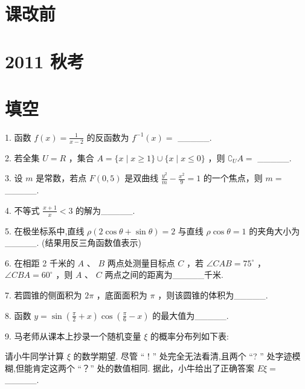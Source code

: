 \documentclass[10pt]{article}
\begin{document}
\section*{课改前}

\section*{2011 秋考}

\section*{填空}

1. 函数 \(f\left( x\right)  = \frac{1}{x - 2}\) 的反函数为 \({f}^{-1}\left( x\right)  =\) \_\_\_\_\_.

2. 若全集 \(U = R\) ，集合 \(A = \{ x \mid  x \geq  1\}  \cup  \{ x \mid  x \leq  0\}\) ，则 \({\complement }_{U}A =\) \_\_\_\_\_.

3. 设 \(m\) 是常数，若点 \(F\left( {0,5}\right)\) 是双曲线 \(\frac{{y}^{2}}{m} - \frac{{x}^{2}}{9} = 1\) 的一个焦点，则 \(m =\) \_\_\_\_\_.

4. 不等式 \(\frac{x + 1}{x} < 3\) 的解为\_\_\_\_\_.

5. 在极坐标系中,直线 \(\rho \left( {2\cos \theta  + \sin \theta }\right)  = 2\) 与直线 \(\rho \cos \theta  = 1\) 的夹角大小为\_\_\_\_\_. (结果用反三角函数值表示)

6. 在相距 2 千米的 \(A\) 、 \(B\) 两点处测量目标点 \(C\) ，若 \(\angle {CAB} = {75}^{ \circ  }\) ， \(\angle {CBA} = {60}^{ \circ  }\) ，则 \(A\) 、 \(C\) 两点之间的距离为\_\_\_\_\_千米.

7. 若圆锥的侧面积为 \({2\pi }\) ，底面面积为 \(\pi\) ，则该圆锥的体积为\_\_\_\_\_.

8. 函数 \(y = \sin \left( {\frac{\pi }{2} + x}\right) \cos \left( {\frac{\pi }{6} - x}\right)\) 的最大值为\_\_\_\_\_.

9. 马老师从课本上抄录一个随机变量 \(\xi\) 的概率分布列如下表:

\begin{center}
\end{center}

请小牛同学计算 \(\xi\) 的数学期望. 尽管 “ ! ” 处完全无法看清,且两个 “? ” 处字迹模糊,但能肯定这两个 “？” 处的数值相同. 据此，小牛给出了正确答案 \({E\xi } =\) \_\_\_\_\_.
\end{document}
